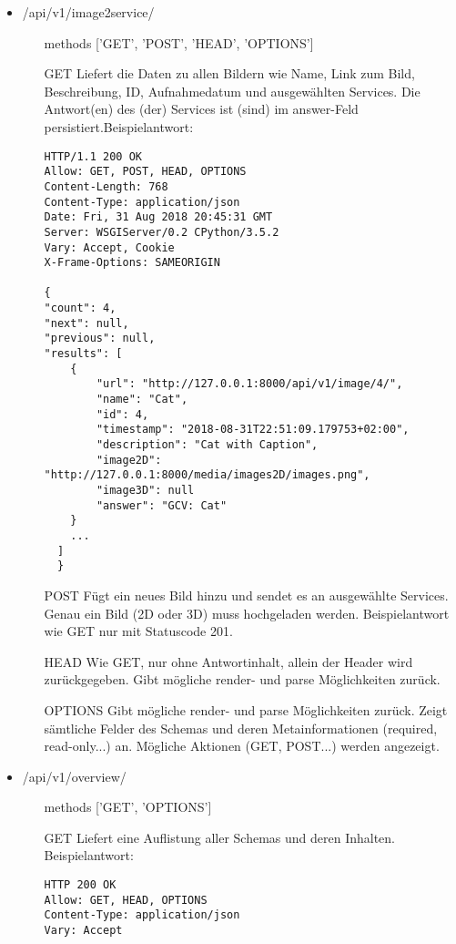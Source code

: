 \begin{itemize}[align=parleft, labelsep=2cm, label={}, leftmargin=1cm]
    	\item \textcolor{mypink1}{/api/v1/image2service/}
	\begin{enumerate}[align=parleft, labelsep=*, leftmargin=*]
		\item[methods] ['GET', 'POST', 'HEAD', 'OPTIONS']
        \item[GET] Liefert die Daten zu allen Bildern wie Name, Link zum Bild, Beschreibung, ID, Aufnahmedatum und ausgewählten Services. Die Antwort(en) des (der) Services ist (sind) im answer-Feld persistiert.Beispielantwort:  
        \begin{verbatim}
HTTP/1.1 200 OK
Allow: GET, POST, HEAD, OPTIONS
Content-Length: 768
Content-Type: application/json
Date: Fri, 31 Aug 2018 20:45:31 GMT
Server: WSGIServer/0.2 CPython/3.5.2
Vary: Accept, Cookie
X-Frame-Options: SAMEORIGIN

{
"count": 4,
"next": null,
"previous": null,
"results": [
    {
        "url": "http://127.0.0.1:8000/api/v1/image/4/",
        "name": "Cat",
        "id": 4,
        "timestamp": "2018-08-31T22:51:09.179753+02:00",
        "description": "Cat with Caption",
        "image2D": "http://127.0.0.1:8000/media/images2D/images.png",
        "image3D": null
        "answer": "GCV: Cat"
    }
    ...
  ]
  }
        \end{verbatim} 
        \item[POST] Fügt ein neues Bild hinzu und sendet es an ausgewählte Services. Genau ein Bild (2D oder 3D) muss hochgeladen werden. Beispielantwort wie GET nur mit Statuscode 201.
     \item[HEAD] Wie GET, nur ohne Antwortinhalt, allein der Header wird zurückgegeben. Gibt mögliche render- und parse Möglichkeiten zurück.
        \item[OPTIONS] Gibt mögliche render- und parse Möglichkeiten zurück. Zeigt sämtliche Felder des Schemas und deren Metainformationen (required, read-only...) an. Mögliche Aktionen (GET, POST...) werden angezeigt.
        
	\end{enumerate}

    	\item \textcolor{mypink1}{/api/v1/overview/} 
        \begin{enumerate}[align=parleft, labelsep=*, leftmargin=*]
		\item[methods] ['GET', 'OPTIONS']
        \item[GET] Liefert eine Auflistung aller Schemas und deren Inhalten. Beispielantwort:
        \begin{verbatim}
HTTP 200 OK
Allow: GET, HEAD, OPTIONS
Content-Type: application/json
Vary: Accept


\end{verbatim}
\end{enumerate}
\end{itemize}
